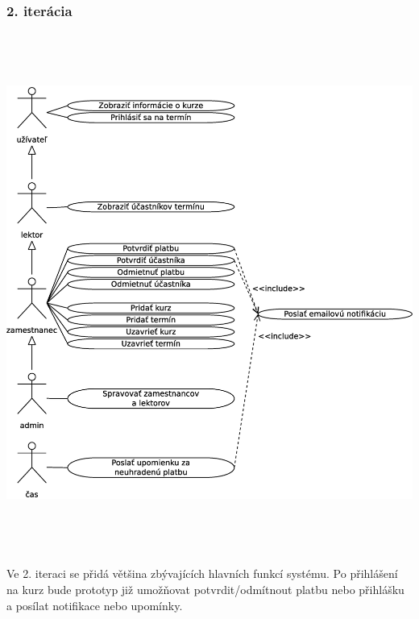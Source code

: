 \documentclass[12pt,a4paper,titlepage,final]{report}
\begin{document}
	\subsubsection{2. iterácia}
		\begin{center}
			\captionsetup{type=figure}
			\includegraphics[height=17cm]{img/use_case_iter2.eps}
		\end{center}			
Ve 2. iteraci se přidá většina zbývajících hlavních funkcí systému. Po přihlášení na kurz bude prototyp již umožňovat potvrdit/odmítnout platbu nebo přihlášku a posílat notifikace nebo upomínky.
	
\end{document}
